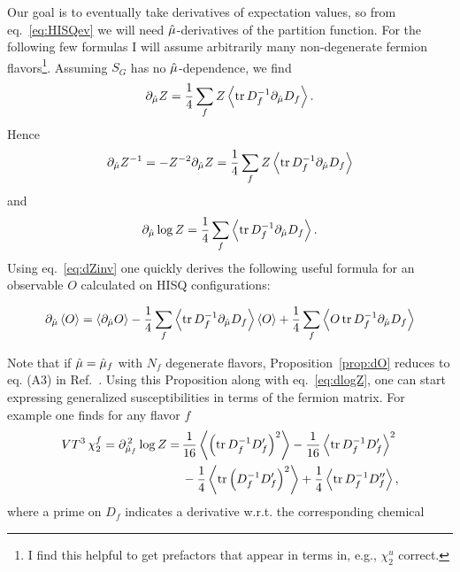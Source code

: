 Our goal is to eventually take derivatives of expectation values, so from
eq.~\eqref{eq:HISQev} we will need $\hat{\mu}$-derivatives of the partition 
function. For the following few formulas 
I will assume arbitrarily many non-degenerate
fermion flavors\footnote{I find this helpful to get prefactors that appear
in terms in, e.g., $\chi_2^u$ correct.}. Assuming $S_G$ has no 
$\hat{\mu}$-dependence, we find
\begin{equation}
  \partial_{\muh}Z = \frac{1}{4}\sum_f 
                      Z\ev{\tr D_f^{-1}\partial_{\muh}D_f}.
\end{equation}
Hence 
\begin{equation}\label{eq:dZinv}
  \partial_{\muh}Z^{-1} = -Z^{-2}\partial_{\muh}Z
                        =\frac{1}{4}\sum_fZ\ev{\tr D_f^{-1}\partial_{\muh}D_f}
\end{equation}
and
\begin{equation}\label{eq:dlogZ}
  \partial_{\muh}\log Z=\frac{1}{4}\sum_f\ev{\tr D_f^{-1}\partial_{\muh}D_f}.
\end{equation}
Using eq.~\eqref{eq:dZinv} one quickly derives the following useful formula
for an observable $O$ calculated on HISQ configurations:
\begin{proposition}{}{}\label{prop:dO}
\begin{equation*} \partial_{\muh}\ev{O}
       =   \ev{\partial_{\muh}O}
        -\frac{1}{4}\sum_f\ev{\tr D_f^{-1}\partial_{\muh}D_f}\ev{O}
         +\frac{1}{4}\sum_f\ev{O\tr D_f^{-1}\partial_{\muh}D_f}
\end{equation*}
\end{proposition} 
Note that if $\hat{\mu}=\hat{\mu}_f$ with $N_f$ degenerate flavors, 
Proposition~\ref{prop:dO} reduces to eq. (A3)
in Ref.~\cite{allton_thermodynamics_2005}. Using this Proposition along
with eq.~\eqref{eq:dlogZ}, one 
can start expressing generalized susceptibilities in terms of the fermion
matrix. For example one finds for any flavor $f$
\begin{equation}\begin{aligned}
  VT^3\,\chi_2^f =\partial_{\muh_f}^{\,2}\log Z
                 =\, & \frac{1}{16}\ev{\left(\tr D_f^{-1}D_f'\right)^2}
                    -\frac{1}{16}\ev{\tr D_f^{-1}D_f'}^2\\
                   & -\frac{1}{4}\ev{\tr \left(D_f^{-1} D_f'\right)^2}
                    +\frac{1}{4}\ev{\tr D_f^{-1}D_f''},
\end{aligned}\end{equation}
where a prime on $D_f$ indicates a derivative w.r.t. the corresponding chemical
